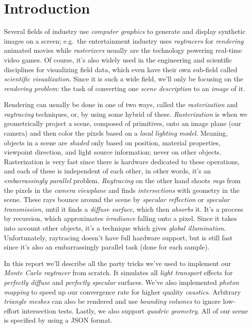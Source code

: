 \documentclass[a4paper, twocolumn]{article}
\begin{document}
    \section{Introduction} \label{sec:introduction}

        Several fields of industry use \emph{computer graphics} to generate and display synthetic images on a screen; e.g.\ the entertainment industry uses \emph{raytracers} for \emph{rendering} animated movies while \emph{rasterizers} usually are the technology powering real-time video games. Of course, it's also widely used in the engineering and scientific disciplines for visualizing field data, which even have their own sub-field called \emph{scientific visualization}. Since it is such a wide field, we'll only be focusing on the \emph{rendering problem}: the task of converting one \emph{scene description} to an \emph{image} of it.

        Rendering can usually be done in one of two ways, called the \emph{rasterization} and \emph{raytracing} techniques, or, by using some hybrid of these. \emph{Rasterization} is when we geometrically project a scene, composed of primitives, onto an image plane (our camera) and then color the pixels based on a \emph{local lighting model}. Meaning, objects in a scene are \emph{shaded} only based on position, material properties, viewpoint direction, and light source information; never on other objects. Rasterization is very fast since there is hardware dedicated to these operations, and each of these is independent of each other, in other words, it's an \emph{embarrassingly parallel} problem. \emph{Raytracing} on the other hand shoots \emph{rays} from the pixels in the \emph{camera viewplane} and finds \emph{intersections} with geometry in the scene. These rays bounce around the scene by \emph{specular reflection} or \emph{specular transmission}, until it finds a \emph{diffuse surface}, which then \emph{absorbs} it. It's a process by recursion, which approximates \emph{irradiance} falling onto a pixel. Since it takes into account other objects, it's a technique which gives \emph{global illumination}. Unfortunately, raytracing doesn't have full hardware support, but is still fast since it's also an embarrassingly parallel task (done for each sample).

        In this report we'll describe all the party tricks we've used to implement our \emph{Monte Carlo raytracer} from scratch. It simulates all \emph{light transport} effects for \emph{perfectly diffuse} and \emph{perfectly specular} surfaces. We've also implemented \emph{photon mapping} to speed up our convergence rate for higher quality \emph{caustics}. Arbitrary \emph{triangle meshes} can also be rendered and use \emph{bounding volumes} to ignore low-effort intersection tests. Lastly, we also support \emph{quadric geometry}. All of our scene is specified by using a JSON format.
\end{document}
